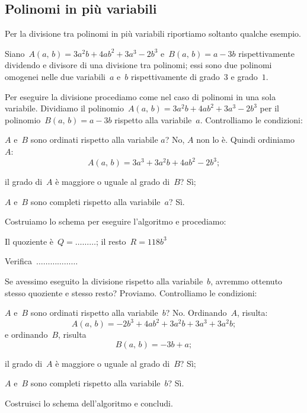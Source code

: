 \subsection{Polinomi in più variabili}
Per la divisione tra polinomi in più variabili riportiamo soltanto qualche esempio.
\begin{exrig}
 \begin{esempio}
Siano~$A(a\text{,~}b)=3a^{2}b+4ab^{2}+3a^{3}-2b^{3}$ e~$B(a\text{,~}b)=a-3b$ rispettivamente dividendo e divisore di una divisione tra polinomi;
essi sono due polinomi omogenei nelle due variabili~$a$ e~$b$ rispettivamente di grado~$3$ e grado~$1$.

Per eseguire la divisione procediamo come nel caso di polinomi in una sola variabile.
Dividiamo il polinomio~$A(a\text{,~}b)=3a^{2}b+4ab^{2}+3a^{3}-2b^{3}$ per il polinomio~$B(a\text{,~}b)=a-3b$ rispetto alla variabile~$a$.
Controlliamo le condizioni:
\begin{itemize*}
\item $A$ e~$B$ sono ordinati rispetto alla variabile $a$? No, $A$ non lo è. Quindi ordiniamo~$A$:
\[A(a\text{,~}b)=3a^{3}+3a^{2}b+4ab^{2}-2b^{3};\]
\item il grado di~$A$ è maggiore o uguale al grado di~$B$? Sì;
\item $A$ e~$B$ sono completi rispetto alla variabile~$a$? Sì.
\end{itemize*}
Costruiamo lo schema per eseguire l'algoritmo e procediamo:
\begin{center}
 
\end{center}
Il quoziente è~$Q =\ldots \ldots \ldots$; il resto~$R = 118b^{3}$

Verifica~$\ldots \ldots \ldots \ldots \ldots \ldots$

Se avessimo eseguito la divisione rispetto alla variabile~$b$, avremmo ottenuto stesso quoziente e stesso resto? Proviamo.
Controlliamo le condizioni:
\begin{itemize*}
\item $A$ e~$B$ sono ordinati rispetto alla variabile~$b$? No. Ordinando~$A$, risulta:
\[A(a\text{,~}b)=-2b^{3}+4ab^{2}+3a^{2}b+3a^{3}+3a^{2}b;\]
e ordinando~$B$, risulta
\[B(a\text{,~}b)=-3b+a;\]
\item il grado di~$A$ è maggiore o uguale al grado di~$B$? Sì;
\item $A$ e~$B$ sono completi rispetto alla variabile~$b$? Sì.
\end{itemize*}
Costruisci lo schema dell'algoritmo e concludi.
 \end{esempio}
\end{exrig}
\ovalbox{\risolvii \ref{ese:11.29}, \ref{ese:11.30}}

